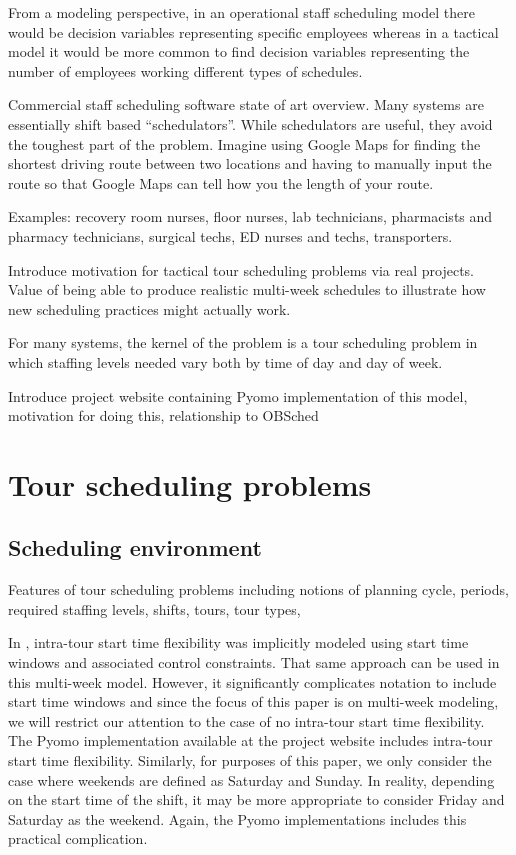 \documentclass{article}
\begin{document}
From a modeling perspective, in an operational staff scheduling model there would be decision variables representing specific employees whereas in a tactical model it would be more common to find decision variables representing the number of employees working different types of schedules.

Commercial staff scheduling software state of art overview. Many systems are essentially shift based ``schedulators''. While schedulators are useful, they avoid the toughest part of the problem. Imagine using Google Maps for finding the shortest driving route between two locations and having to manually input the route so that Google Maps can tell how you the length of your route.

Examples: recovery room nurses, floor nurses, lab technicians, pharmacists and pharmacy technicians, surgical techs, ED nurses and techs, transporters.

Introduce motivation for tactical tour scheduling problems via real projects. Value of being able to produce realistic multi-week schedules to illustrate how new scheduling practices might actually work.

For many systems, the kernel of the problem is a tour scheduling problem in which staffing levels needed vary both by time of day and day of week. 

Introduce project website containing Pyomo implementation of this model, motivation for doing this, relationship to OBSched

\section{Tour scheduling problems}

\subsection{Scheduling environment}
\label{sec-schedenv}

Features of tour scheduling problems including notions of planning cycle, periods, required staffing levels, shifts, tours, tour types, 

In \cite{isken:2004}, intra-tour start time flexibility was implicitly modeled using start time windows and associated control constraints. That same approach can be used in this multi-week model. However, it significantly complicates notation to include start time windows and since the focus of this paper is on multi-week modeling, we will restrict our attention to the case of no intra-tour start time flexibility. The Pyomo implementation available at the project website includes intra-tour start time flexibility.  Similarly, for purposes of this paper, we only consider the case where weekends are defined as Saturday and Sunday. In reality, depending on the start time of the shift, it may be more appropriate to consider Friday and Saturday as the weekend. Again, the Pyomo implementations includes this practical complication. 
\end{document}
